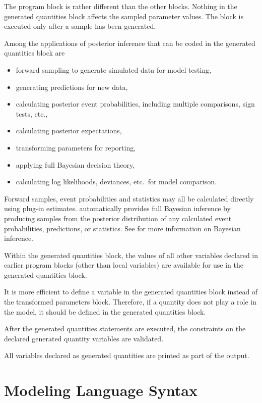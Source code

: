 The  program block is rather different than
the other blocks.  Nothing in the generated quantities block affects
the sampled parameter values.  The block is executed only after a
sample has been generated.  

Among the applications of posterior inference that can be coded in the
generated quantities block are
%
\begin{itemize}
\item forward sampling to generate simulated data for model testing,
\item generating predictions for new data,
\item calculating posterior event probabilities, including multiple comparisons,
  sign tests, etc.,
\item calculating posterior expectations,
\item transforming parameters for reporting,
\item applying full Bayesian decision theory,
\item calculating log likelihoods, deviances, etc.\ for model comparison.
\end{itemize}
%
Forward samples, event probabilities and statistics may all be
calculated directly using plug-in estimates.  \Stan automatically
provides full Bayesian inference by producing samples from the
posterior distribution of any calculated event probabilities,
predictions, or statistics.  See  for more
information on Bayesian inference.

Within the generated quantities block, the values of all other variables
declared in earlier program blocks (other than local variables) are
available for use in the generated quantities block.

It is more efficient to define a variable in the generated quantities
block instead of the transformed parameters block.  Therefore, if a
quantity does not play a role in the model, it should be defined in
the generated quantities block.  

After the generated quantities statements are executed, the constraints
on the declared generated quantity variables are validated.

All variables declared as generated quantities are printed as part of
the output. 

\chapter{Modeling Language Syntax}

